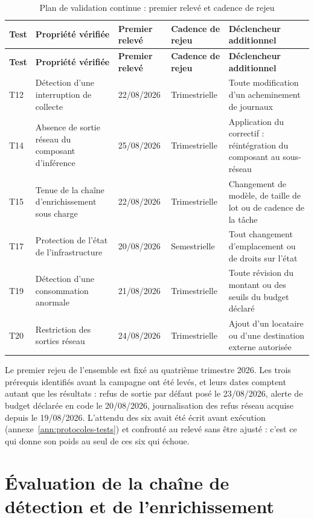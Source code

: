 {\footnotesize
\setlength{\tabcolsep}{3pt}
\begin{longtable}{|P{0.8cm}|P{3.9cm}|P{1.6cm}|P{1.85cm}|P{6.7cm}|}
\caption[Plan de validation continue]{Plan de validation continue : premier relevé et cadence de rejeu}
\label{tab:plan-validation} \\
\hline
\textbf{Test} & \textbf{Propriété vérifiée} & \textbf{Premier relevé} & \textbf{Cadence de rejeu} &
\textbf{Déclencheur additionnel} \\
\hline
\endfirsthead
\hline
\textbf{Test} & \textbf{Propriété vérifiée} & \textbf{Premier relevé} & \textbf{Cadence de rejeu} &
\textbf{Déclencheur additionnel} \\
\hline
\endhead
T12 & Détection d'une interruption de collecte & 22/08/2026 & Trimestrielle & Toute modification
d'un acheminement de journaux \\ \hline
T14 & Absence de sortie réseau du composant d'inférence & 25/08/2026 & Trimestrielle & Application
du correctif : réintégration du composant au sous-réseau \\ \hline
T15 & Tenue de la chaîne d'enrichissement sous charge & 22/08/2026 & Trimestrielle & Changement de
modèle, de taille de lot ou de cadence de la tâche \\ \hline
T17 & Protection de l'état de l'infrastructure & 20/08/2026 & Semestrielle & Tout changement
d'emplacement ou de droits sur l'état \\ \hline
T19 & Détection d'une consommation anormale & 21/08/2026 & Trimestrielle & Toute révision du
montant ou des seuils du budget déclaré \\ \hline
T20 & Restriction des sorties réseau & 24/08/2026 & Trimestrielle & Ajout d'un locataire ou d'une
destination externe autorisée \\
\hline
\end{longtable}
}

Le premier rejeu de l'ensemble est fixé au quatrième trimestre 2026. Les trois prérequis identifiés
avant la campagne ont été levés, et leurs dates comptent autant que les résultats : refus de sortie
par défaut posé le 23/08/2026, alerte de budget déclarée en code le 20/08/2026, journalisation des
refus réseau acquise depuis le 19/08/2026. L'attendu des six avait été écrit avant exécution
(annexe~\ref{ann:protocoles-tests}) et confronté au relevé sans être ajusté : c'est ce qui donne
son poids au seul de ces six qui échoue.

\section{Évaluation de la chaîne de détection et de l'enrichissement}
\label{sec:eval-detection}

